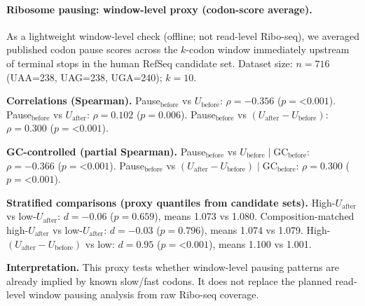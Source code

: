 \paragraph{Ribosome pausing: window-level proxy (codon-score average).}
As a lightweight window-level check (offline; not read-level Ribo-seq), we averaged published codon pause scores across the $k$-codon window immediately upstream of terminal stops in the human RefSeq candidate set.
Dataset size: $n=716$ (UAA=238, UAG=238, UGA=240); $k=10$.

\textbf{Correlations (Spearman).}
Pause$_{\mathrm{before}}$ vs $U_{\mathrm{before}}$: $\rho=-0.356$ ($p=$<$0.001$).
Pause$_{\mathrm{before}}$ vs $U_{\mathrm{after}}$: $\rho=0.102$ ($p=0.006$).
Pause$_{\mathrm{before}}$ vs $(U_{\mathrm{after}}-U_{\mathrm{before}})$: $\rho=0.300$ ($p=$<$0.001$).

\textbf{GC-controlled (partial Spearman).}
Pause$_{\mathrm{before}}$ vs $U_{\mathrm{before}}\mid\mathrm{GC}_{\mathrm{before}}$: $\rho=-0.366$ ($p=$<$0.001$).
Pause$_{\mathrm{before}}$ vs $(U_{\mathrm{after}}-U_{\mathrm{before}})\mid\mathrm{GC}_{\mathrm{before}}$: $\rho=0.300$ ($p=$<$0.001$).

\textbf{Stratified comparisons (proxy quantiles from candidate sets).}
High-$U_{\mathrm{after}}$ vs low-$U_{\mathrm{after}}$: $d=-0.06$ ($p=0.659$), means 1.073 vs 1.080.
Composition-matched high-$U_{\mathrm{after}}$ vs low-$U_{\mathrm{after}}$: $d=-0.03$ ($p=0.796$), means 1.074 vs 1.079.
High-$(U_{\mathrm{after}}-U_{\mathrm{before}})$ vs low: $d=0.95$ ($p=$<$0.001$), means 1.100 vs 1.001.

\textbf{Interpretation.} This proxy tests whether window-level pausing patterns are already implied by known slow/fast codons. It does not replace the planned read-level window pausing analysis from raw Ribo-seq coverage.

